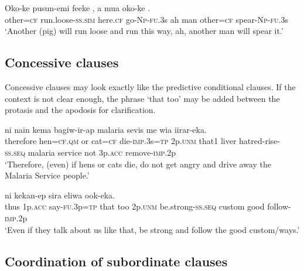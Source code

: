 \ea%
\label{ex:x1850}
\gll Oko-ke  pusun-emi  feeke  \textstyleEmphasizedVernacularWords{-}\textstyleEmphasizedVernacularWords{-},  a  mua oko-ke  \textstyleEmphasizedVernacularWords{-}\textstyleEmphasizedVernacularWords{-}.\\
other=\textsc{cf} run.loose-\textsc{ss}.\textsc{sim} here.\textsc{cf}  go-\textsc{Np}-\textsc{fu}.3s ah man other=\textsc{cf} spear-\textsc{Np}-\textsc{fu}.3s\\
\glt`Another (pig) will run loose and run this way, ah, another man will spear it.'
\z
{}


\subsection{Concessive clauses}

Concessive clauses may look exactly like the predictive conditional clauses. If the context is not clear enough, the phrase  `that too' may be added between the protasis and the apodosis for clarification.  

\ea%
\label{ex:x1655}
\gll [Naapeya aara=ki e kasi=ke um-inok=na] ni nain kema bagiw-ir-ap  malaria sevis me wia iirar-eka.\\
therefore hen=\textsc{cf}.\textsc{qm} or cat=\textsc{cf} die-\textsc{imp}.3s=\textsc{tp} 2p.\textsc{unm} that1 liver hatred-rise-\textsc{ss}.\textsc{seq} malaria  service  not 3p.\textsc{acc} remove-\textsc{imp}.2p\\
\glt`Therefore, (even) if hens or cats die, do not get angry and drive away the Malaria Service people.'
\z


\ea%
\label{ex:x1430}
\gll [Naap  yia  ma-ikuan=na]      ni  kekan-ep sira  eliwa  ook-eka.\\
thus  1p.\textsc{acc} say-\textsc{fu}.3p=\textsc{tp} that too 2p.\textsc{unm} be.strong-\textsc{ss}.\textsc{seq} custom good follow-\textsc{imp}.2p\\
\glt`Even if they talk about us like that, be strong and follow the good custom/ways.'
\z


\subsection{Coordination of subordinate clauses} 


